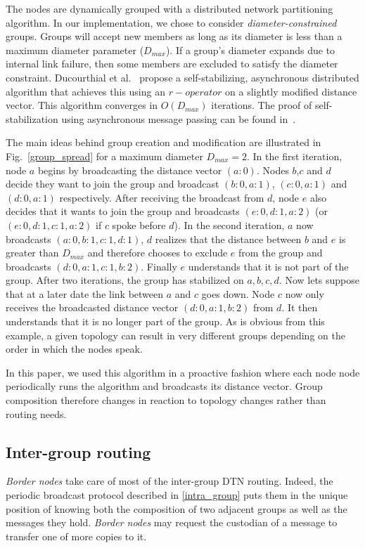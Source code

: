 \documentclass[10pt,twocolumn,letterpaper]{article}
\begin{document}
The nodes are dynamically grouped with a distributed network partitioning algorithm.
In our implementation, we chose to consider
\emph{diameter-constrained} groups. Groups will accept new members as
long as its diameter is less than a maximum diameter parameter
($D_{max}$). If a group's diameter expands due to internal link
failure, then some members are excluded to satisfy the diameter
constraint. Ducourthial et al.~\cite{DKP08} propose a
self-stabilizing, asynchronous distributed algorithm that achieves
this using an \mbox{$r-operator$} on a slightly modified distance
vector. This algorithm converges in $O(D_{max})$ iterations. The proof
of self-stabilization using asynchronous message passing can be found
in~\cite{r_operators}.

The main ideas behind group creation and modification are illustrated
in Fig.~\ref{group_spread} for a maximum diameter $D_{max}=2$. In the
first iteration, node $a$ begins by broadcasting the distance vector
$(a:0)$. Nodes $b$,$c$ and $d$ decide they want to join the group and
broadcast $(b:0,a:1)$, $(c:0,a:1)$ and $(d:0,a:1)$ respectively. After
receiving the broadcast from $d$, node $e$ also decides that it wants
to join the group and broadcasts $(e:0,d:1,a:2)$ (or
$(e:0,d:1,c:1,a:2)$ if $c$ spoke before $d$). In the second iteration,
$a$ now broadcasts $(a:0,b:1,c:1,d:1)$, $d$ realizes that the distance
between $b$ and $e$ is greater than $D_{max}$ and therefore chooses to
exclude $e$ from the group and broadcasts $(d:0,a:1,c:1,b:2)$. Finally
$e$ understands that it is not part of the group. After two
iterations, the group has stabilized on $a,b,c,d$. Now lets suppose
that at a later date the link between $a$ and $c$ goes down. Node $c$
now only receives the broadcasted distance vector $(d:0,a:1,b:2)$ from
$d$. It then understands that it is no longer part of the group. As is
obvious from this example, a given topology can result in very
different groups depending on the order in which the nodes speak.

In this paper, we used this algorithm in a proactive fashion where
each node node periodically runs the algorithm and broadcasts its
distance vector. Group composition therefore changes in reaction to
topology changes rather than routing needs.

\subsection{Inter-group routing}
\label{inter_group}

\textit{Border nodes} take care of most of the inter-group DTN
routing. Indeed, the periodic broadcast protocol described in
\ref{intra_group} puts them in the unique position of knowing both the
composition of two adjacent groups as well as the messages they
hold. \textit{Border nodes} may request the custodian of a message to
transfer one of more copies to it.
\end{document}
